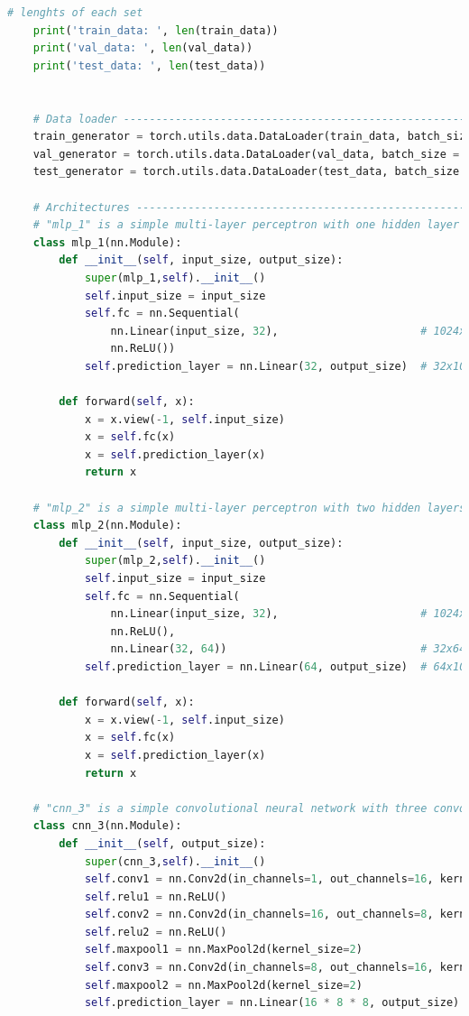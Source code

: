 \documentclass[3p,times,procedia]{elsarticle}
\begin{document}
\begin{lstlisting}[language=Python]
    # lenghts of each set
    print('train_data: ', len(train_data))
    print('val_data: ', len(val_data))
    print('test_data: ', len(test_data))
    
    
    # Data loader -----------------------------------------------------------------------------#
    train_generator = torch.utils.data.DataLoader(train_data, batch_size = batch_size, shuffle = True)
    val_generator = torch.utils.data.DataLoader(val_data, batch_size = batch_size )
    test_generator = torch.utils.data.DataLoader(test_data, batch_size = batch_size ) 
    
    # Architectures ----------------------------------------------------------------------------#
    # "mlp_1" is a simple multi-layer perceptron with one hidden layer
    class mlp_1(nn.Module):
        def __init__(self, input_size, output_size):
            super(mlp_1,self).__init__()
            self.input_size = input_size
            self.fc = nn.Sequential(
                nn.Linear(input_size, 32),                      # 1024x32
                nn.ReLU())                                      
            self.prediction_layer = nn.Linear(32, output_size)  # 32x10
        
        def forward(self, x):
            x = x.view(-1, self.input_size)
            x = self.fc(x)
            x = self.prediction_layer(x)
            return x
        
    # "mlp_2" is a simple multi-layer perceptron with two hidden layers
    class mlp_2(nn.Module):
        def __init__(self, input_size, output_size):
            super(mlp_2,self).__init__()
            self.input_size = input_size
            self.fc = nn.Sequential(
                nn.Linear(input_size, 32),                      # 1024x32
                nn.ReLU(),
                nn.Linear(32, 64))                              # 32x64
            self.prediction_layer = nn.Linear(64, output_size)  # 64x10
        
        def forward(self, x):
            x = x.view(-1, self.input_size)
            x = self.fc(x)
            x = self.prediction_layer(x)
            return x
        
    # "cnn_3" is a simple convolutional neural network with three convolutional layers
    class cnn_3(nn.Module):
        def __init__(self, output_size):
            super(cnn_3,self).__init__()
            self.conv1 = nn.Conv2d(in_channels=1, out_channels=16, kernel_size=3, padding=1)  # 1x32x32 -> 16x32x32
            self.relu1 = nn.ReLU()
            self.conv2 = nn.Conv2d(in_channels=16, out_channels=8, kernel_size=5, padding=2)  # 16x32x32 -> 8x32x32
            self.relu2 = nn.ReLU()
            self.maxpool1 = nn.MaxPool2d(kernel_size=2)                                       # 8x32x32 -> 8x16x16                        
            self.conv3 = nn.Conv2d(in_channels=8, out_channels=16, kernel_size=7, padding=3)  # 8x16x16 -> 16x16x16
            self.maxpool2 = nn.MaxPool2d(kernel_size=2)                                       # 16x16x16 -> 16x8x8
            self.prediction_layer = nn.Linear(16 * 8 * 8, output_size)                        # 16x8x8 -> 10
    

\end{lstlisting}
\end{document}
